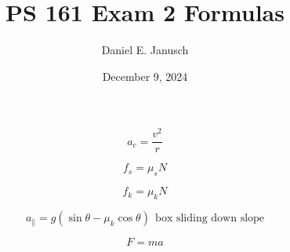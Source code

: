 \documentclass[12pt]{article}
\begin{document}

\title{PS 161 Exam 2 Formulas}
\author{Daniel E. Janusch}
\date{December 9, 2024}
\maketitle
\fi

\begin{equation}
	a_c = \dfrac{v^2} r
\end{equation}

\begin{equation}
	f_s = \mu_s N
\end{equation}

\begin{equation}
	f_k = \mu_k N
\end{equation}

\begin{equation}
	a_\parallel = g(\sin \theta - \mu_k \cos \theta) ~~ \text{box sliding down slope}
\end{equation}

\begin{equation}
	F = m a
\end{equation}

\ifx \combinedDocuments \undefined
\end{document}
